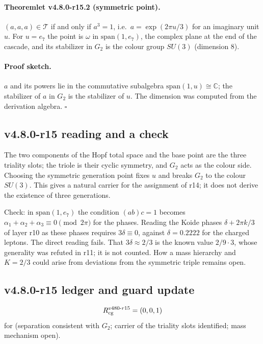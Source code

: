 \paragraph{Theoremlet v4.8.0-r15.2 (symmetric point).}
\((a,a,a)\in\mathcal T\) if and only if \(a^3=1\), i.e.\ \(a=\exp(2\pi u/3)\) for an imaginary unit \(u\).  For
\(u=e_7\) the point is \(\omega\) in \(\mathrm{span}(1,e_7)\), the complex plane at the end of the cascade, and
its stabilizer in \(G_2\) is the colour group \(SU(3)\) (dimension \(8\)).

\paragraph{Proof sketch.}
\(a\) and its powers lie in the commutative subalgebra \(\mathrm{span}(1,u)\cong\mathbb C\); the stabilizer of
\(a\) in \(G_2\) is the stabilizer of \(u\).  The dimension was computed from the derivation algebra.  \(\square\)

\subsection*{v4.8.0-r15 reading and a check}
\label{subsec:v480-r15-reading}

The two components of the Hopf total space and the base point are the three triality slots; the triole is their
cyclic symmetry, and \(G_2\) acts as the colour side.  Choosing the symmetric generation point fixes \(u\) and breaks
\(G_2\) to the colour \(SU(3)\).  This gives a natural carrier for the assignment of r14; it does not derive the
existence of three generations.

Check: in \(\mathrm{span}(1,e_7)\) the condition \((ab)c=1\) becomes \(\alpha_1+\alpha_2+\alpha_3\equiv0\pmod{2\pi}\)
for the phases.  Reading the Koide phases \(\delta+2\pi k/3\) of layer r10 as these phases requires
\(3\delta\equiv0\), against \(\delta=0.2222\) for the charged leptons.  The direct reading fails.  That
\(3\delta\approx2/3\) is the known value \(2/9\cdot3\), whose generality was refuted in r11; it is not counted.  How
a mass hierarchy and \(K=2/3\) could arise from deviations from the symmetric triple remains open.

\subsection*{v4.8.0-r15 ledger and guard update}
\label{subsec:v480-r15-ledger-guard}

\[
R_{\rm cg}^{v480\text{-}r15}=(0,0,1)
\]
for (separation consistent with \(G_2\); carrier of the triality slots identified; mass mechanism open).

